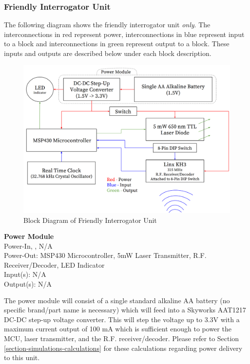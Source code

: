 \documentclass[letterpaper,10pt]{article}
\begin{document}
\begin{spacing}{1.15}
\subsubsection{Friendly Interrogator Unit} \label{section-friendly-interrogator-design}
The following diagram shows the friendly interrogator unit \textit{only}. The interconnections in red represent power, interconnections in blue represent input to a block and interconnections in green represent output to a block. These inputs and outputs are described below under each block description.
\begin{figure} [H]
\centering
\includegraphics[scale=0.5]{Friendly_Interrogator_Block_Diagram.png}
\caption{Block Diagram of Friendly Interrogator Unit\label{fig:friendly-interrogator-block}}
\end{figure}

\normalsize\textbf{Power Module} \\
Power-In, ,  N/A \\
Power-Out: MSP430 Microcontroller, 5mW Laser Transmitter, R.F. Receiver/Decoder, LED Indicator \\
Input(s): N/A\\
Output(s): N/A

The power module will consist of a single standard alkaline AA battery (no specific brand/part name is necessary) which will feed into a Skyworks AAT1217 DC-DC step-up voltage converter. This will step the voltage up to 3.3V with a maximum current output of 100 mA which is sufficient enough to power the MCU, laser transmitter, and the R.F. receiver/decoder. Please refer to Section \ref{section-simulations-calculations} for these calculations regarding power delivery to this unit.


\end{spacing}
\end{document}

